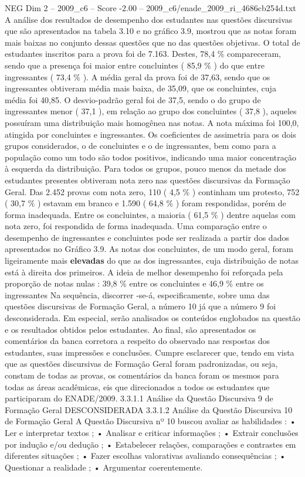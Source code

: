 \begin{textsample}{NEG Dim 2 – 2009\_c6 – Score -2.00 – 2009\_c6/enade\_2009\_ri\_4686cb254d.txt}
A análise dos resultados de desempenho dos estudantes nas questões discursivas que são apresentados na tabela 3.10 e no gráfico 3.9, mostrou que as notas foram mais baixas no conjunto dessas questões que no das questões objetivas.
O total de estudantes inscritos para a prova foi de 7.163.
Destes, 78,4 \% compareceram, sendo que a presença foi maior entre concluintes ( 85,9 \% ) do que entre ingressantes ( 73,4 \% ).
A média geral da prova foi de 37,63, sendo que os ingressantes obtiveram média mais baixa, de 35,09, que os concluintes, cuja média foi 40,85.
O desvio-padrão geral foi de 37,5, sendo o do grupo de ingressantes menor ( 37,1 ), em relação ao grupo dos concluintes ( 37,8 ), aqueles possuíram uma distribuição mais homogênea nas notas.
A nota máxima foi 100,0, atingida por concluintes e ingressantes.
Os coeficientes de assimetria para os dois grupos considerados, o de concluintes e o de ingressantes, bem como para a população como um todo são todos positivos, indicando uma maior concentração à esquerda da distribuição.
Para todos os grupos, pouco menos da metade dos estudantes presentes obtiveram nota zero nas questões discursivas da Formação Geral.
Das 2.452 provas com nota zero, 110 ( 4,5 \% ) continham um protesto, 752 ( 30,7 \% ) estavam em branco e 1.590 ( 64,8 \% ) foram respondidas, porém de forma inadequada.
Entre os concluintes, a maioria ( 61,5 \% ) dentre aquelas com nota zero, foi respondida de forma inadequada.
Uma comparação entre o desempenho de ingressantes e concluintes pode ser realizada a partir dos dados apresentados no Gráfico 3.9.
As notas dos concluintes, de um modo geral, foram ligeiramente mais \textbf{elevadas} do que as dos ingressantes, cuja distribuição de notas está à direita dos primeiros.
A ideia de melhor desempenho foi reforçada pela proporção de notas nulas : 39,8 \% entre os concluintes e 46,9 \% entre os ingressantes Na sequência, discorrer -se-á, especificamente, sobre uma das questões discursivas de Formação Geral, a número 10 já que a número 9 foi desconsiderada.
Em especial, serão analisados os conteúdos englobados na questão e os resultados obtidos pelos estudantes.
Ao final, são apresentados os comentários da banca corretora a respeito do observado nas respostas dos estudantes, suas impressões e conclusões.
Cumpre esclarecer que, tendo em vista que as questões discursivas de Formação Geral foram padronizadas, ou seja, constam de todas as provas, os comentários da banca foram os mesmos para todas as áreas acadêmicas, eis que direcionados a todos os estudantes que participaram do ENADE/2009. 3.3.1.1 Análise da Questão Discursiva 9 de Formação Geral DESCONSIDERADA 3.3.1.2 Análise da Questão Discursiva 10 de Formação Geral A Questão Discursiva nº 10 buscou avaliar as habilidades : • Ler e interpretar textos ; • Analisar e criticar informações ; • Extrair conclusões por indução e/ou dedução ; • Estabelecer relações, comparações e contrastes em diferentes situações ; • Fazer escolhas valorativas avaliando consequências ; • Questionar a realidade ; • Argumentar coerentemente.

\end{textsample}
